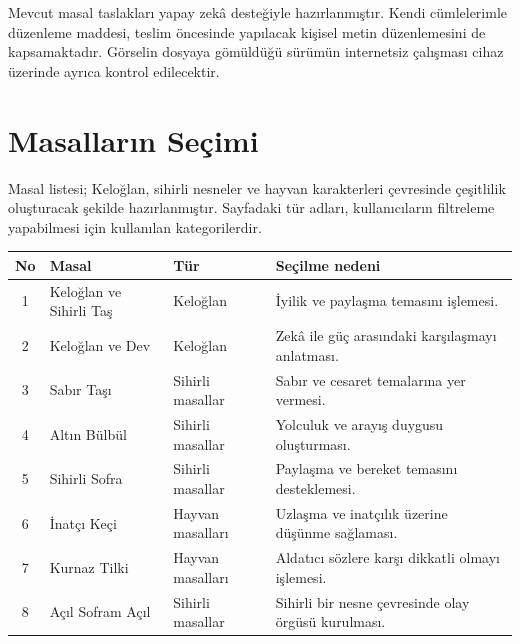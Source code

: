 \documentclass[12pt,a4paper]{article}
\begin{document}
Mevcut masal taslakları yapay zekâ desteğiyle hazırlanmıştır.
Kendi cümlelerimle düzenleme maddesi, teslim öncesinde
yapılacak kişisel metin düzenlemesini de kapsamaktadır.
Görselin dosyaya gömüldüğü sürümün internetsiz çalışması
cihaz üzerinde ayrıca kontrol edilecektir.

\section{Masalların Seçimi}

Masal listesi; Keloğlan, sihirli nesneler ve hayvan
karakterleri çevresinde çeşitlilik oluşturacak şekilde
hazırlanmıştır. Sayfadaki tür adları, kullanıcıların
filtreleme yapabilmesi için kullanılan kategorilerdir.

\begin{longtable}{@{}cp{3.9cm}p{2.8cm}p{5.1cm}@{}}
\toprule
\textbf{No} & \textbf{Masal} & \textbf{Tür}
& \textbf{Seçilme nedeni}\\
\midrule
\endhead

1 & Keloğlan ve Sihirli Taş & Keloğlan
& İyilik ve paylaşma temasını işlemesi.\\

2 & Keloğlan ve Dev & Keloğlan
& Zekâ ile güç arasındaki karşılaşmayı anlatması.\\

3 & Sabır Taşı & Sihirli masallar
& Sabır ve cesaret temalarına yer vermesi.\\

4 & Altın Bülbül & Sihirli masallar
& Yolculuk ve arayış duygusu oluşturması.\\

5 & Sihirli Sofra & Sihirli masallar
& Paylaşma ve bereket temasını desteklemesi.\\

6 & İnatçı Keçi & Hayvan masalları
& Uzlaşma ve inatçılık üzerine düşünme sağlaması.\\

7 & Kurnaz Tilki & Hayvan masalları
& Aldatıcı sözlere karşı dikkatli olmayı işlemesi.\\

8 & Açıl Sofram Açıl & Sihirli masallar
& Sihirli bir nesne çevresinde olay örgüsü kurulması.\\

\bottomrule
\end{longtable}
\end{document}
